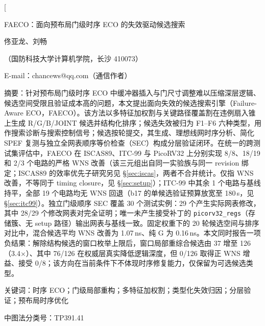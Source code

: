 \documentclass[twocolumn,10pt,fontset=windows]{ctexart}
\let\songti\songfamily\let\heiti\heifamily\let\fangsong\fangfamily
\begin{document}
\pagestyle{plain}

\twocolumn[
\vspace*{-0.25cm}
\begin{center}
{\heiti{} FAECO：面向预布局门级时序 ECO 的失效驱动候选搜索}\par
\vspace{6pt}
{\fangsong{} 佟亚龙、刘畅}\par
\vspace{4pt}
{\songti\fontsize{8}{12}\selectfont（国防科技大学计算机学院，长沙 410073）}\par\vspace{2pt}
{\songti\fontsize{8}{12}\selectfont E-mail：chancews@qq.com（通信作者）}\par
\vspace{6pt}
\end{center}
\begin{flushleft}
  {\heiti\fontsize{8.5}{13}\selectfont 摘\quad 要：}{\songti\fontsize{8.5}{13}\selectfont 针对预布局门级时序 ECO 中缓冲器插入与门尺寸调整难以压缩深层逻辑、候选空间受限且验证成本高的问题，本文提出面向失效的候选搜索引擎（Failure-Aware ECO，FAECO）。该方法以多特征加权割与关键路径覆盖割在违例扇入锥上生成 R/G/B/JOINT 候选并结构化排序；候选失效被归为 F1--F6 六种类型，用作搜索诊断与搜索控制信号；候选按轮提交，其生成、理想线网时序分析、简化 SPEF 复测与独立全网表顺序等价检查（SEC）构成分层验证闭环。在统一的跨测试集评估中，FAECO 在 ISCAS89、ITC-99 与 PicoRV32 上分别实现 8/8、18/19 和 2/3 个电路的严格 WNS 改善（该三元组出自同一实验族与同一 revision 绑定；ISCAS89 的效率优先子研究另见 \S\ref{sec:iscas}，两者不合并统计。仅指 WNS 改善，不等同于 timing closure，见 \S\ref{sec:setup}）；ITC-99 中其余 1 个电路与基线持平，全部 19 个电路均无 WNS 回退（b17 的单候选验证预算放宽至 180\,s，见 \S\ref{sec:itc99}）。独立门级顺序 SEC 覆盖 30 个测试实例：29 个产生实际网表修改，其中 28/29 个修改网表对完全证明；唯一未产生接受补丁的 \texttt{picorv32\_regs}（存储簇、无 setup 路径）输出网表与基线一致。固定权重下的 20 轮候选空间与排序对比中，混合候选平均 WNS 改善为 1.07\,ns、纯 G 为 0.16\,ns。本文同时报告一项负结果：解除结构候选的窗口枚举上限后，窗口局部重综合候选由 37 增至 126（3.4$\times$）、其中 76/126 在权威层真实降低逻辑深度，但 0/126 取得正 WNS 增益、接受 0/8；该方向在当前条件下不体现时序修复能力，仅保留为可选候选类型。}
\par
\vspace{4pt}
{\heiti\fontsize{8.5}{13}\selectfont 关键词：}{\songti\fontsize{8.5}{13}\selectfont 时序 ECO；门级局部重构；多特征加权割；类型化失效归因；分层验证；预布局时序优化}\par
\vspace{2pt}
{\songti\fontsize{8.5}{13}\selectfont 中图法分类号：TP391.41}\par
\vspace{3pt}
\end{flushleft}
\end{document}
